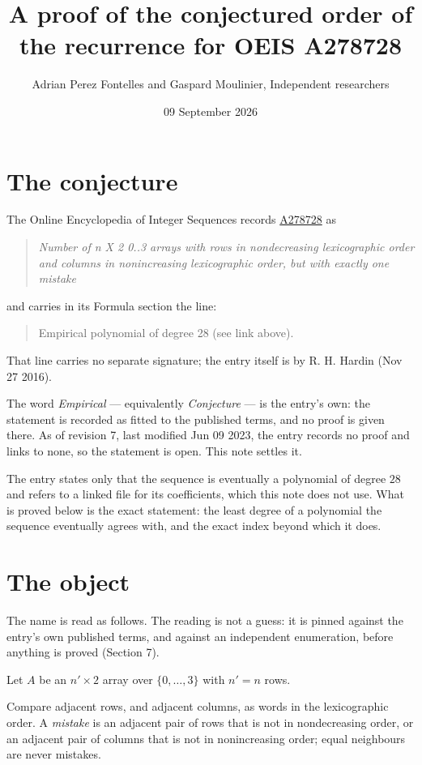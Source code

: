 \documentclass[11pt]{article}
\title{A proof of the conjectured order of the recurrence for OEIS A278728}
\author{Adrian Perez Fontelles and Gaspard Moulinier, Independent researchers}
\date{09 September 2026}
\theoremstyle{definition}
\begin{document}
\maketitle
\section{The conjecture}

The Online Encyclopedia of Integer Sequences records \href{https://oeis.org/A278728}{A278728} as

\begin{quote}\itshape Number of n X 2 0..3 arrays with rows in nondecreasing lexicographic order and columns in nonincreasing lexicographic order, but with exactly one mistake\end{quote}

and carries in its Formula section the line:

\begin{quote}\ttfamily Empirical polynomial of degree 28 (see link above).\end{quote}

That line carries no separate signature; the entry itself is by R. H. Hardin (Nov 27 2016).

The word {\itshape Empirical} --- equivalently {\itshape Conjecture} --- is the entry's own: the statement is recorded as fitted to the published terms, and no proof is given there. As of revision 7, last modified Jun 09 2023, the entry records no proof and links to none, so the statement is open. This note settles it.

The entry states only that the sequence is eventually a polynomial of degree $28$ and refers to a linked file for its coefficients, which this note does not use. What is proved below is the exact statement: the least degree of a polynomial the sequence eventually agrees with, and the exact index beyond which it does.

\section{The object}

The name is read as follows. The reading is not a guess: it is pinned against the entry's own published terms, and against an independent enumeration, before anything is proved (Section 7).

Let $A$ be an $n' \times 2$ array over $\{0,\dots,3\}$ with $n' = n$ rows.

Compare adjacent rows, and adjacent columns, as words in the lexicographic order. A {\itshape mistake} is an adjacent pair of rows that is not in nondecreasing order, or an adjacent pair of columns that is not in nonincreasing order; equal neighbours are never mistakes.
\end{document}
